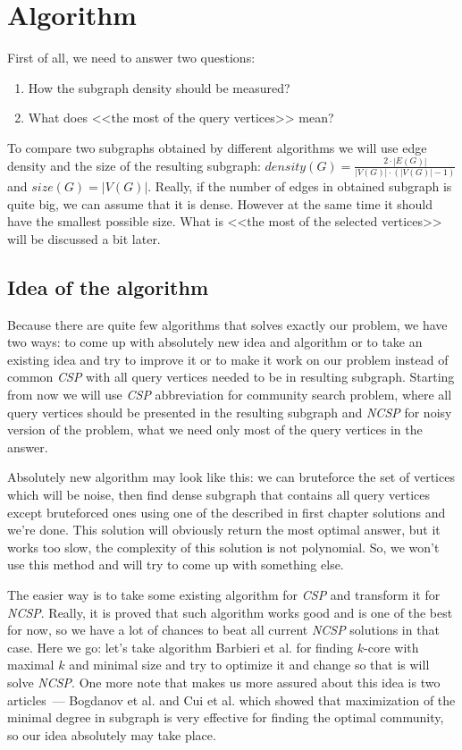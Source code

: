 \chapter{Algorithm}

First of all, we need to answer two questions:

\begin{enumerate}
  \item How the subgraph density should be measured?
  \item What does <<the most of the query vertices>> mean?
\end{enumerate}

To compare two subgraphs obtained by different algorithms we will use edge density and the size of the resulting subgraph: $density(G) = \frac{2 \cdot |E(G)|}{|V(G)| \cdot (|V(G)| - 1)}$ and $size(G) = |V(G)|$. Really, if the number of edges in obtained subgraph is quite big, we can assume that it is dense. However at the same time it should have the smallest possible size. What is <<the most of the selected vertices>> will be discussed a bit later.

\section{Idea of the algorithm}

Because there are quite few algorithms that solves exactly our problem, we have two ways: to come up with absolutely new idea and algorithm or to take an existing idea and try to improve it or to make it work on our problem instead of common \textit{CSP} with all query vertices needed to be in resulting subgraph. Starting from now we will use \textit{CSP} abbreviation for community search problem, where all query vertices should be presented in the resulting subgraph and \textit{NCSP} for noisy version of the problem, what we need only most of the query vertices in the answer.

Absolutely new algorithm may look like this: we can bruteforce the set of vertices which will be noise, then find dense subgraph that contains all query vertices except bruteforced ones using one of the described in first chapter solutions and we're done. This solution will obviously return the most optimal answer, but it works too slow, the complexity of this solution is not polynomial. So, we won't use this method and will try to come up with something else.

The easier way is to take some existing algorithm for \textit{CSP} and transform it for \textit{NCSP}. Really, it is proved that such algorithm works good and is one of the best for now, so we have a lot of chances to beat all current \textit{NCSP} solutions in that case. Here we go: let's take algorithm Barbieri et al. \cite{Barbieri15} for finding $k$-core with maximal $k$ and minimal size and try to optimize it and change so that is will solve \textit{NCSP}. One more note that makes us more assured about this idea is two articles~--- Bogdanov et al. \cite{Bogdanov13} and Cui et al. \cite{Cui14} which showed that maximization of the minimal degree in subgraph is very effective for finding the optimal community, so our idea absolutely may take place.

